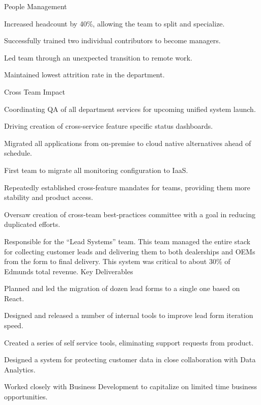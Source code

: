 \documentclass[]{deedy-resume-openfont}
\begin{document}
\sectionsep
People Management
\begin{tightemize}
\item Increased headcount by 40\%, allowing the team to split and specialize.
\item Successfully trained two individual contributors to become managers.
\item Led team through an unexpected transition to remote work.
\item Maintained lowest attrition rate in the department.
\end{tightemize}
\sectionsep
Cross Team Impact
\begin{tightemize}
\item Coordinating QA of all department services for upcoming unified system launch.
\item Driving creation of cross-service feature specific status dashboards.
\item Migrated all applications from on-premise to cloud native alternatives ahead of schedule.
\item First team to migrate all monitoring configuration to IaaS.
\item Repeatedly established cross-feature mandates for teams, providing them more stability and product access.
\item Oversaw creation of cross-team best-practices committee with a goal in reducing duplicated efforts.
\end{tightemize}
\sectionsep

\vspace{\topsep}
Responsible for the ``Lead Systems'' team. This team managed the entire stack for collecting customer leads and delivering them to both dealerships and OEMs from the form to final delivery. This system was critical to about 30\% of Edmunds total revenue.
\vspace{\topsep}
Key Deliverables
\begin{tightemize}
\item Planned and led the migration of dozen lead forms to a single one based on React.
\item Designed and released a number of internal tools to improve lead form iteration speed.
\item Created a series of self service tools, eliminating support requests from product.
\item Designed a system for protecting customer data in close collaboration with Data Analytics.
\item Worked closely with Business Development to capitalize on limited time business opportunities.
\end{tightemize}
\end{document}

